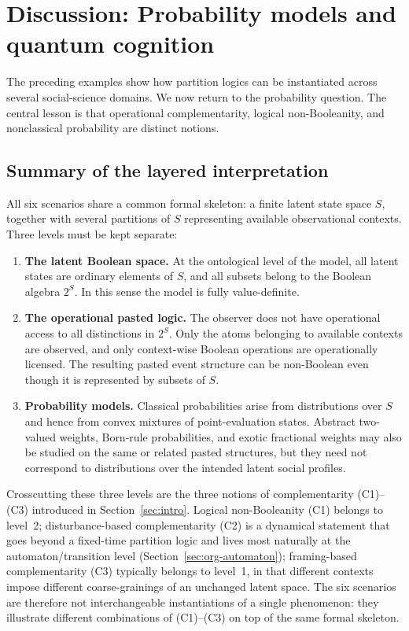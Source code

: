 \documentclass{article}
\begin{document}
\section{Discussion: Probability models and quantum cognition}
\label{sec:discussion}

The preceding examples show how partition logics can be instantiated
across several social-science domains. We now return to the
probability question. The central lesson is that operational
complementarity, logical non-Booleanity, and nonclassical
probability are distinct notions.

\subsection{Summary of the layered interpretation}

All six scenarios share a common formal skeleton: a finite latent
state space $S$, together with several partitions of $S$ representing
available observational contexts. Three levels must be kept separate:

\begin{enumerate}
\item \textbf{The latent Boolean space.}
At the ontological level of the model, all latent states are ordinary
elements of $S$, and all subsets belong to the Boolean algebra
$2^S$. In this sense the model is fully value-definite.

\item \textbf{The operational pasted logic.}
The observer does not have operational access to all distinctions in
$2^S$. Only the atoms belonging to available contexts are observed,
and only context-wise Boolean operations are operationally licensed.
The resulting pasted event structure can be non-Boolean even though
it is represented by subsets of $S$.

\item \textbf{Probability models.}
Classical probabilities arise from distributions over $S$ and hence
from convex mixtures of point-evaluation states. Abstract two-valued
weights, Born-rule probabilities, and exotic fractional weights may
also be studied on the same or related pasted structures, but they
need not correspond to distributions over the intended latent social
profiles.
\end{enumerate}

Crosscutting these three levels are the three notions of
complementarity (C1)--(C3) introduced in Section~\ref{sec:intro}.
Logical non-Booleanity (C1) belongs to level~2; disturbance-based
complementarity (C2) is a dynamical statement that goes beyond a
fixed-time partition logic and lives most naturally at the
automaton/transition level (Section~\ref{sec:org-automaton});
framing-based complementarity (C3) typically belongs to level~1, in
that different contexts impose different coarse-grainings of an
unchanged latent space. The six scenarios are therefore not
interchangeable instantiations of a single phenomenon: they
illustrate different combinations of (C1)--(C3) on top of the same
formal skeleton.
\end{document}
